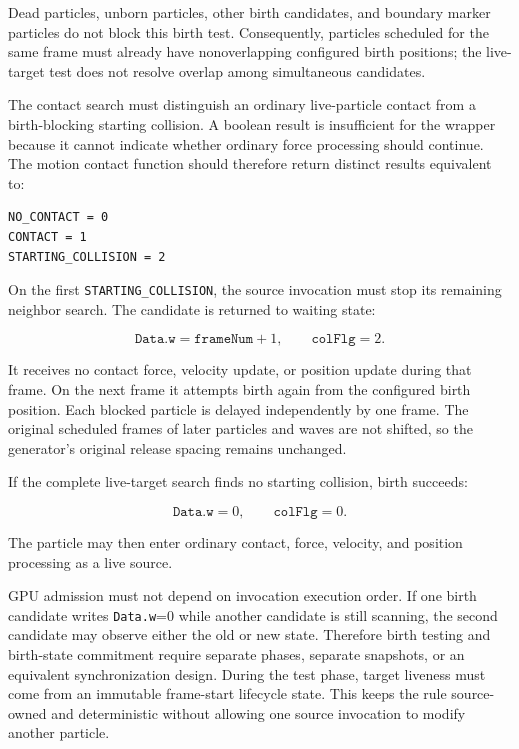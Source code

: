 Dead particles, unborn particles, other birth candidates, and boundary marker
particles do not block this birth test.  Consequently, particles scheduled for
the same frame must already have nonoverlapping configured birth positions;
the live-target test does not resolve overlap among simultaneous candidates.

The contact search must distinguish an ordinary live-particle contact from a
birth-blocking starting collision.  A boolean result is insufficient for the
wrapper because it cannot indicate whether ordinary force processing should
continue.  The motion contact function should therefore return distinct
results equivalent to:

\begin{verbatim}
NO_CONTACT = 0
CONTACT = 1
STARTING_COLLISION = 2
\end{verbatim}

On the first \texttt{STARTING\_COLLISION}, the source invocation must stop its
remaining neighbor search.  The candidate is returned to waiting state:

\begin{equation}
\texttt{Data.w}=\texttt{frameNum}+1,
\qquad
\texttt{colFlg}=2.
\end{equation}

It receives no contact force, velocity update, or position update during that
frame.  On the next frame it attempts birth again from the configured birth
position.  Each blocked particle is delayed independently by one frame.  The
original scheduled frames of later particles and waves are not shifted, so the
generator's original release spacing remains unchanged.

If the complete live-target search finds no starting collision, birth
succeeds:

\begin{equation}
\texttt{Data.w}=0,
\qquad
\texttt{colFlg}=0.
\end{equation}

The particle may then enter ordinary contact, force, velocity, and position
processing as a live source.

GPU admission must not depend on invocation execution order.  If one birth
candidate writes \texttt{Data.w}=0 while another candidate is still scanning,
the second candidate may observe either the old or new state.  Therefore birth
testing and birth-state commitment require separate phases, separate snapshots,
or an equivalent synchronization design.  During the test phase, target
liveness must come from an immutable frame-start lifecycle state.  This keeps
the rule source-owned and deterministic without allowing one source invocation
to modify another particle.

